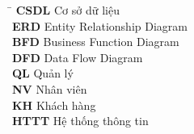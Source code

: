 \documentclass[a4paper,12pt]{report}
\begin{document}
\vspace{2em}

\begin{tabbing}
    \hspace{2.5cm} \= \kill
    \textbf{CSDL} \> Cơ sở dữ liệu \\
    \textbf{ERD} \> Entity Relationship Diagram \\
    \textbf{BFD} \> Business Function Diagram \\
    \textbf{DFD} \> Data Flow Diagram \\
    \textbf{QL} \> Quản lý \\
    \textbf{NV} \> Nhân viên \\
    \textbf{KH} \> Khách hàng \\
    \textbf{HTTT} \> Hệ thống thông tin \\
\end{tabbing}
\end{document}
